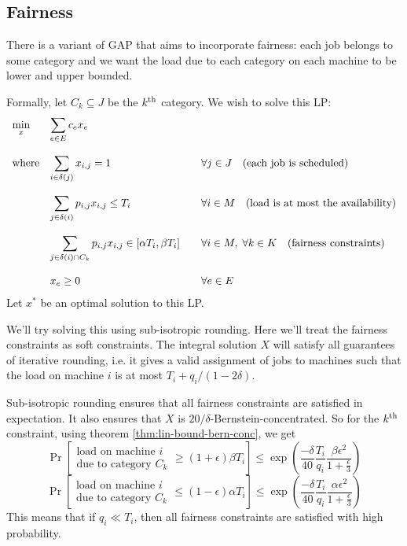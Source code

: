 \subsection{Fairness}

There is a variant of GAP that aims to incorporate fairness:
each job belongs to some category and we want the load due to each category
on each machine to be lower and upper bounded.

Formally, let $C_k \subseteq J$ be the $k^{\textrm{th}}$ category.
We wish to solve this LP:
\[ \begin{array}{*3{>{\displaystyle}l}}
\min_x & \sum_{e \in E}{c_e}{x_e} &
\\ \\ \textrm{where} & \sum_{i \in \delta(j)} x_{i,j} = 1 & \quad \forall j \in J
\quad \textrm{(each job is scheduled)}
\\ \\ & \sum_{j \in \delta(i)} p_{i,j} x_{i,j} \le T_i & \quad \forall i \in M
\quad \textrm{(load is at most the availability)}
\\ \\ & \sum_{j \in \delta(i) \cap C_k} p_{i,j} x_{i,j} \in [\alpha T_i, \beta T_i]
& \quad \forall i \in M, \; \forall k \in K \quad \textrm{(fairness constraints)}
\\ \\ & x_e \ge 0 & \quad \forall e \in E
\end{array} \]
Let $x^*$ be an optimal solution to this LP.

We'll try solving this using sub-isotropic rounding.
Here we'll treat the fairness constraints as soft constraints.
The integral solution $X$ will satisfy all guarantees of iterative rounding,
i.e. it gives a valid assignment of jobs to machines such that the
load on machine $i$ is at most $T_i + q_i/(1-2\delta)$.

Sub-isotropic rounding ensures that all fairness constraints are satisfied in expectation.
It also ensures that $X$ is $20/\delta$-Bernstein-concentrated.
So for the $k^{\textrm{th}}$ constraint, using theorem \ref{thm:lin-bound-bern-conc}, we get
\[ \Pr\left[ \begin{array}{cc}\textrm{load on machine } i
\\ \textrm{due to category } C_k \end{array} \ge (1+\epsilon)\beta T_i \right]
\le \exp\left( \frac{-\delta}{40} \frac{T_i}{q_i}
\frac{\beta\epsilon^2}{1+\frac{\epsilon}{3}} \right) \]
\[ \Pr\left[ \begin{array}{cc}\textrm{load on machine } i
\\ \textrm{due to category } C_k \end{array} \le (1-\epsilon)\alpha T_i \right]
\le \exp\left( \frac{-\delta}{40} \frac{T_i}{q_i}
\frac{\alpha\epsilon^2}{1+\frac{\epsilon}{3}} \right) \]
This means that if $q_i \ll T_i$, then all fairness constraints
are satisfied with high probability.
